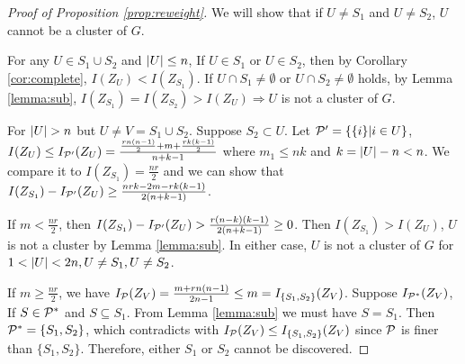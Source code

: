 \begin{proof}[Proof of Proposition \ref{prop:reweight}]
	We will show that if $U \neq S_1$ and $U \neq S_2$, $U$ cannot be a cluster of $G$.
	
For any $U \in S_1 \cup S_2 $ and $\abs{U} \leq n$, If $U \in S_1$ or $U \in S_2$, then by Corollary \ref{cor:complete}, $I(Z_U) < I(Z_{S_1})$.
If $U \cap S_1 \neq \emptyset$ or $U \cap S_2 \neq \emptyset$ holds, by Lemma \ref{lemma:sub}, $I(Z_{S_1})= I(Z_{S_2}) > I(Z_U) \Rightarrow U$ is not a cluster of $G$.

For $\abs{U} > n$ but $U \neq V = S_1 \cup S_2$. Suppose $S_2 \subset U$. Let $\P' = \{\{i\}| i\in U\}$, $I(Z_U) \leq I_{\P'}(Z_U) = \frac{\frac{rn(n-1)}{2} + m + \frac{rk(k-1)}{2}}{n+k-1}$ where $m_1 \leq nk$ and $k=\abs{U} - n < n$. 
We compare it to $I(Z_{S_1}) = \frac{nr}{2}$ and we can show that $I(Z_{S_1}) - I_{\P'}(Z_U) \geq \frac{nrk-2m-rk(k-1)}{2(n+k-1)}$. 

If $m < \frac{nr}{2}$, then $I(Z_{S_1}) - I_{\P'}(Z_U) > \frac{r(n-k)(k-1)}{2(n+k-1)} \geq 0$. Then $I(Z_{S_1})>I(Z_U)$, $U$ is not a cluster by Lemma \ref{lemma:sub}. In either case, $U$ is not a cluster of $G$ for $1<\abs{U}<2n, U \neq S_1, U\neq S_2$. 

If $m \geq \frac{nr}{2}$, we have $I_{\P}(Z_V) = \frac{m+rn(n-1)}{2n-1} \leq m = I_{\{S_1, S_2\}}(Z_V)$. Suppose $I_{\P^*}(Z_V)$, If $S\in \P^*$ and $S\subseteq S_1$. From Lemma \ref{lemma:sub} we must have $S=S_1$. Then $\P^*=\{S_1, S_2\}$, which contradicts with
$I_{\P}(Z_V)  \leq  I_{\{S_1, S_2\}}(Z_V)$ since $\P$ is finer than $\{S_1, S_2\}$. Therefore, either $S_1$ or $S_2$ cannot be discovered.

\end{proof}
